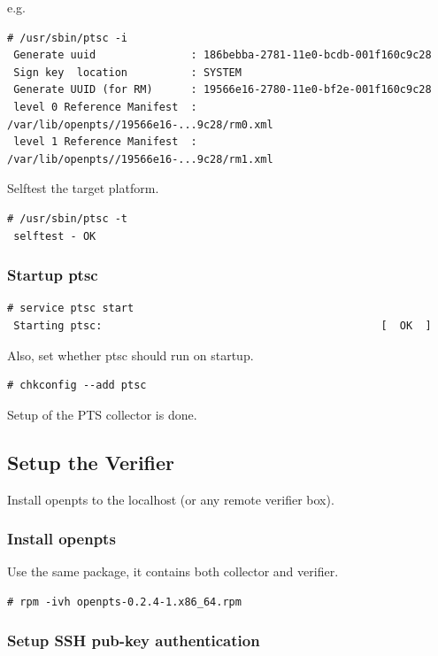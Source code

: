 e.g.
\begin{lstlisting}[style=console]
 # /usr/sbin/ptsc -i
 Generate uuid               : 186bebba-2781-11e0-bcdb-001f160c9c28 
 Sign key  location          : SYSTEM
 Generate UUID (for RM)      : 19566e16-2780-11e0-bf2e-001f160c9c28 
 level 0 Reference Manifest  : /var/lib/openpts//19566e16-...9c28/rm0.xml
 level 1 Reference Manifest  : /var/lib/openpts//19566e16-...9c28/rm1.xml
\end{lstlisting}

Selftest the target platform.
\begin{lstlisting}[style=console]
 # /usr/sbin/ptsc -t
 selftest - OK
\end{lstlisting}

\subsubsection{Startup ptsc}
\begin{lstlisting}[style=console]
 # service ptsc start
 Starting ptsc:                                            [  OK  ]
\end{lstlisting}

Also, set whether ptsc should run on startup.

\begin{lstlisting}[style=console]
 # chkconfig --add ptsc
\end{lstlisting}



Setup of the PTS collector is done.


\subsection{Setup the Verifier} 

Install openpts to the localhost (or any remote verifier box).

\subsubsection{Install openpts}

Use the same package, it contains both collector and verifier.

\begin{lstlisting}[style=console]
 # rpm -ivh openpts-0.2.4-1.x86_64.rpm
\end{lstlisting}


\subsubsection{Setup SSH pub-key authentication}

